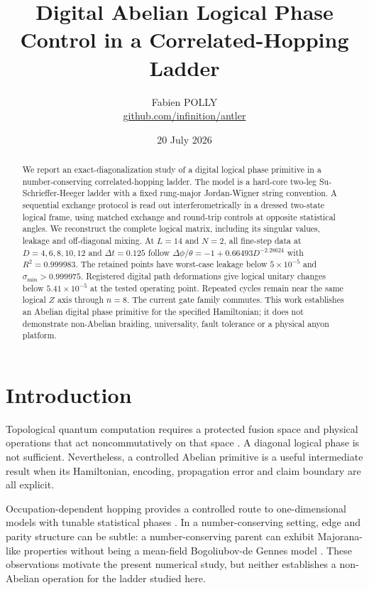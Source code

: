 \documentclass[11pt]{article}
\title{Digital Abelian Logical Phase Control in a Correlated-Hopping Ladder}
\author{Fabien POLLY\\
\href{https://github.com/infinition/antler}{github.com/infinition/antler}}
\date{20 July 2026}
\begin{document}
\maketitle

\begin{abstract}
We report an exact-diagonalization study of a digital logical phase primitive
in a number-conserving correlated-hopping ladder. The model is a hard-core
two-leg Su-Schrieffer-Heeger ladder with a fixed rung-major Jordan-Wigner
string convention. A sequential exchange protocol is read out interferometrically
in a dressed two-state logical frame, using matched exchange and round-trip
controls at opposite statistical angles. We reconstruct the complete logical
matrix, including its singular values, leakage and off-diagonal mixing. At
$L=14$ and $N=2$, all fine-step data at $D=4,6,8,10,12$ and
$\Delta t=0.125$ follow
$\Delta\phi/\theta=-1+0.66493D^{-2.28624}$ with $R^2=0.999983$.
The retained points have worst-case leakage below $5\times10^{-5}$ and
$\sigma_{\min}>0.999975$. Registered digital path deformations give logical
unitary changes below $5.41\times10^{-5}$ at the tested operating point.
Repeated cycles remain near the same logical $Z$ axis through $n=8$.
The current gate family commutes. This work establishes an Abelian digital
phase primitive for the specified Hamiltonian; it does not demonstrate
non-Abelian braiding, universality, fault tolerance or a physical anyon
platform.
\end{abstract}

\section{Introduction}

Topological quantum computation requires a protected fusion space and
physical operations that act noncommutatively on that space
\cite{nayak2008nonabelian,kitaev2001unpaired,alicea2011wire}. A diagonal
logical phase is not sufficient. Nevertheless, a controlled Abelian primitive
is a useful intermediate result when its Hamiltonian, encoding, propagation
error and claim boundary are all explicit.

Occupation-dependent hopping provides a controlled route to one-dimensional
models with tunable statistical phases \cite{keilmann2011statistics}. In a
number-conserving setting, edge and parity structure can be subtle: a
number-conserving parent can exhibit Majorana-like properties without being a
mean-field Bogoliubov-de Gennes model \cite{iemini2015localized}. These
observations motivate the present numerical study, but neither establishes a
non-Abelian operation for the ladder studied here.
\end{document}
